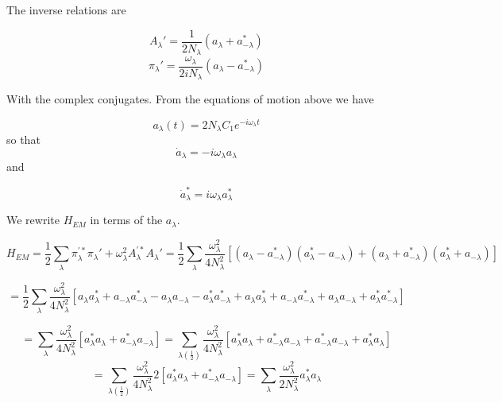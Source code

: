 \documentclass[12pt]{article}
\begin{document}
The inverse relations are

\[A_{\lambda}' = \frac{1}{2N_{\lambda}} (a_{\lambda}+a_{-\lambda}^*) \] 
\[\pi_{\lambda}' = \frac{\omega_{\lambda}}{2iN_{\lambda}}(a_{\lambda} - a_{-\lambda}^*) \]

With the complex conjugates.
From the equations of motion above we have

\[a_{\lambda}(t) = 2N_{\lambda}C_1 e^{-i\omega_{\lambda}t} \]
so that
\[\dot{a}_{\lambda} = -i\omega_{\lambda} a_{\lambda} \]
and

\[\dot{a}_{\lambda}^* = i\omega_{\lambda} a_{\lambda}^* \]

We rewrite $H_{EM}$ in terms of the $a_{\lambda}$.
 
\[H_{EM} = \frac{1}{2}\sum_{\lambda} \pi_{\lambda}^{'*} \pi_{\lambda}' + \omega_{\lambda}^2 A_{\lambda}^{'*} A_{\lambda}' = 
\frac{1}{2} \sum_{\lambda} \frac{\omega_{\lambda}^2}{4N_{\lambda}^2} \left[ (a_{\lambda} -a_{-\lambda}^*)(a_{\lambda}^* - a_{-\lambda}) + (a_{\lambda}+a_{-\lambda}^*)(a_{\lambda}^* +a_{-\lambda})\right]   \]

\[ = \frac{1}{2} \sum_{\lambda} \frac{\omega_{\lambda}^2}{4N_{\lambda}^2} \left[ a_{\lambda}a_{\lambda}^* + a_{-\lambda}a_{-\lambda}^* - a_{\lambda}a_{-\lambda}  - a_{\lambda}^*a_{-\lambda}^*  + a_{\lambda}a_{\lambda}^*  +a_{-\lambda}a_{-\lambda}^*  + a_{\lambda}a_{-\lambda}  + a_{\lambda}^*a_{-\lambda}^* \right] \]

\[ = \sum_{\lambda} \frac{\omega_{\lambda}^2}{4N_{\lambda}^2} \left[a_{\lambda}^* a_{\lambda} + a_{-\lambda}^* a_{-\lambda}\right] 
= \sum_{\lambda \left(\frac{1}{2}\right)} \frac{\omega_{\lambda}^2}{4N_{\lambda}^2} \left[a_{\lambda}^* a_{\lambda} + a_{-\lambda}^* a_{-\lambda} + a_{-\lambda}^* a_{-\lambda} + a_{\lambda}^* a_{\lambda}\right] \]
\[ = \sum_{\lambda \left(\frac{1}{2}\right)} \frac{\omega_{\lambda}^2}{4N_{\lambda}^2} 2\left[a_{\lambda}^* a_{\lambda} + a_{-\lambda}^*a_{-\lambda} \right] 
= \sum_{\lambda} \frac{\omega_{\lambda}^2}{2N_{\lambda}^2} a_{\lambda}^* a_{\lambda}  \]
\end{document}
